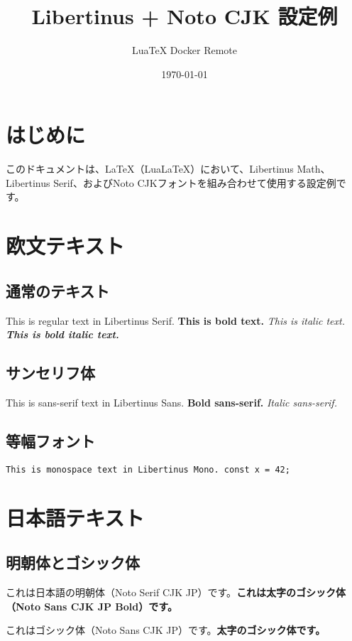 \documentclass[a4paper,12pt]{ltjsarticle}
\title{Libertinus + Noto CJK 設定例}
\author{LuaTeX Docker Remote}
\date{\today}
\begin{document}
\maketitle

\section{はじめに}

このドキュメントは、\LaTeX{}（Lua\LaTeX{}）において、Libertinus Math、Libertinus Serif、およびNoto CJKフォントを組み合わせて使用する設定例です。

\section{欧文テキスト}

\subsection{通常のテキスト}

This is regular text in Libertinus Serif. \textbf{This is bold text.} \textit{This is italic text.} \textbf{\textit{This is bold italic text.}}

\subsection{サンセリフ体}

\textsf{This is sans-serif text in Libertinus Sans. \textbf{Bold sans-serif.} \textit{Italic sans-serif.}}

\subsection{等幅フォント}

\texttt{This is monospace text in Libertinus Mono. const x = 42;}

\section{日本語テキスト}

\subsection{明朝体とゴシック体}

これは日本語の明朝体（Noto Serif CJK JP）です。\textbf{これは太字のゴシック体（Noto Sans CJK JP Bold）です。}

\textsf{これはゴシック体（Noto Sans CJK JP）です。\textbf{太字のゴシック体です。}}
\end{document}
